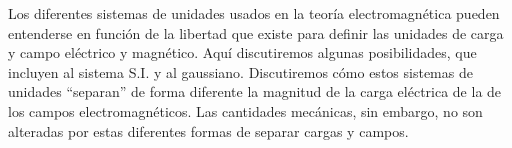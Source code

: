 Los diferentes sistemas de unidades usados en la teoría electromagnética pueden entenderse en función de la libertad que existe para definir las unidades de carga y campo eléctrico y magnético. Aquí discutiremos algunas posibilidades, que incluyen al sistema S.I. y al gaussiano. Discutiremos cómo estos sistemas de unidades ``separan'' de forma diferente la magnitud de la carga eléctrica de la de los campos electromagnéticos. Las cantidades mecánicas, sin embargo, no son alteradas por estas diferentes formas de separar cargas y campos.

